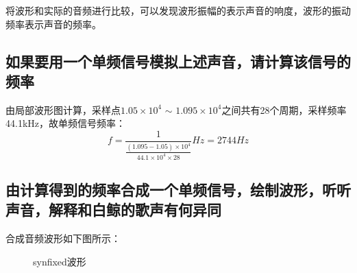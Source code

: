 \documentclass{article}
\begin{document}
            将波形和实际的音频进行比较，可以发现波形振幅的表示声音的响度，波形的振动频率表示声音的频率。

        \subsection{如果要用一个单频信号模拟上述声音，请计算该信号的频率}
            由局部波形图计算，采样点$1.05\times10^4$ $\sim$ $1.095\times10^4$之间共有28个周期，采样频率44.1kHz，故单频信号频率：
            $$f=\frac{1}{\frac{(1.095-1.05)\times10^4}{44.1\times10^4\times28}}Hz=2744Hz$$
            
        \subsection{由计算得到的频率合成一个单频信号，绘制波形，听听声音，解释和白鲸的歌声有何异同}
            合成音频波形如下图所示：
            \begin{figure}[htb]
                \centering
                \hspace{10pt}
                \caption{synfixed波形}
                \label{fig:synfixed}
            \end{figure}
            
\end{document}
